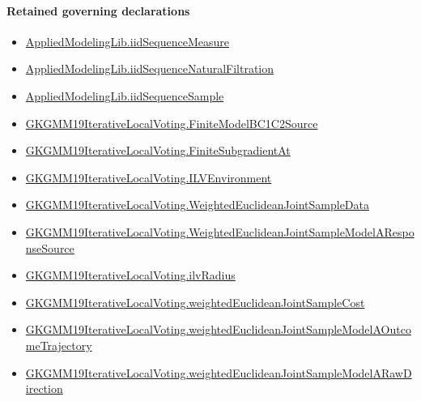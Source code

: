 \documentclass[10pt]{article}
\begin{document}
\paragraph{Retained governing declarations}
\begin{itemize}\raggedright
\item \hyperlink{governing-declaration-f1b1ee19fc287ae5}{Applied\allowbreak{}Modeling\allowbreak{}Lib.\allowbreak{}iid\allowbreak{}Sequence\allowbreak{}Measure}
\item \hyperlink{governing-declaration-e6e69ddc4ae6dcb6}{Applied\allowbreak{}Modeling\allowbreak{}Lib.\allowbreak{}iid\allowbreak{}Sequence\allowbreak{}Natural\allowbreak{}Filtration}
\item \hyperlink{governing-declaration-92cd13a68efc3be4}{Applied\allowbreak{}Modeling\allowbreak{}Lib.\allowbreak{}iid\allowbreak{}Sequence\allowbreak{}Sample}
\item \hyperlink{governing-declaration-b2172f203bb89b25}{GKGMM19\allowbreak{}Iterative\allowbreak{}Local\allowbreak{}Voting.\allowbreak{}Finite\allowbreak{}Model\allowbreak{}BC1\allowbreak{}C2\allowbreak{}Source}
\item \hyperlink{governing-declaration-e4f39da4bff46cef}{GKGMM19\allowbreak{}Iterative\allowbreak{}Local\allowbreak{}Voting.\allowbreak{}Finite\allowbreak{}Subgradient\allowbreak{}At}
\item \hyperlink{governing-declaration-df2ca62df1846667}{GKGMM19\allowbreak{}Iterative\allowbreak{}Local\allowbreak{}Voting.\allowbreak{}ILV\allowbreak{}Environment}
\item \hyperlink{governing-declaration-b9220a54a8f8ff22}{GKGMM19\allowbreak{}Iterative\allowbreak{}Local\allowbreak{}Voting.\allowbreak{}Weighted\allowbreak{}Euclidean\allowbreak{}Joint\allowbreak{}Sample\allowbreak{}Data}
\item \hyperlink{governing-declaration-8559d608aec9f691}{GKGMM19\allowbreak{}Iterative\allowbreak{}Local\allowbreak{}Voting.\allowbreak{}Weighted\allowbreak{}Euclidean\allowbreak{}Joint\allowbreak{}Sample\allowbreak{}Model\allowbreak{}A\allowbreak{}Response\allowbreak{}Source}
\item \hyperlink{governing-declaration-2cfd8c76662024e1}{GKGMM19\allowbreak{}Iterative\allowbreak{}Local\allowbreak{}Voting.\allowbreak{}ilv\allowbreak{}Radius}
\item \hyperlink{governing-declaration-56b43b29b0757532}{GKGMM19\allowbreak{}Iterative\allowbreak{}Local\allowbreak{}Voting.\allowbreak{}weighted\allowbreak{}Euclidean\allowbreak{}Joint\allowbreak{}Sample\allowbreak{}Cost}
\item \hyperlink{governing-declaration-68cc7fb40a11cfdb}{GKGMM19\allowbreak{}Iterative\allowbreak{}Local\allowbreak{}Voting.\allowbreak{}weighted\allowbreak{}Euclidean\allowbreak{}Joint\allowbreak{}Sample\allowbreak{}Model\allowbreak{}A\allowbreak{}Outcome\allowbreak{}Trajectory}
\item \hyperlink{governing-declaration-262fe8cdbc205fbc}{GKGMM19\allowbreak{}Iterative\allowbreak{}Local\allowbreak{}Voting.\allowbreak{}weighted\allowbreak{}Euclidean\allowbreak{}Joint\allowbreak{}Sample\allowbreak{}Model\allowbreak{}A\allowbreak{}Raw\allowbreak{}Direction}
\end{itemize}
\end{document}
